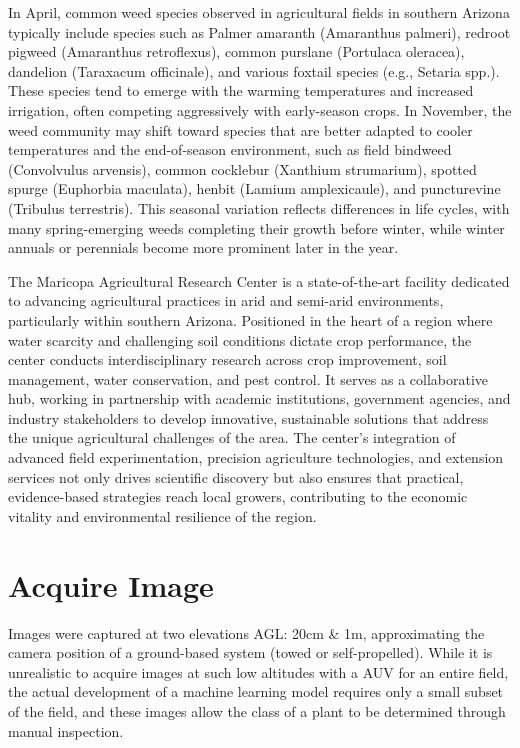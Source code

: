 \documentclass[letterpaper]{report}
\begin{document}
In April, common weed species observed in agricultural fields in southern Arizona typically include species such as Palmer amaranth (Amaranthus palmeri), redroot pigweed (Amaranthus retroflexus), common purslane (Portulaca oleracea), dandelion (Taraxacum officinale), and various foxtail species (e.g., Setaria spp.). These species tend to emerge with the warming temperatures and increased irrigation, often competing aggressively with early-season crops. In November, the weed community may shift toward species that are better adapted to cooler temperatures and the end-of-season environment, such as field bindweed (Convolvulus arvensis), common cocklebur (Xanthium strumarium), spotted spurge (Euphorbia maculata), henbit (Lamium amplexicaule), and puncturevine (Tribulus terrestris). This seasonal variation reflects differences in life cycles, with many spring-emerging weeds completing their growth before winter, while winter annuals or perennials become more prominent later in the year.

The Maricopa Agricultural Research Center is a state-of-the-art facility dedicated to advancing agricultural practices in arid and semi-arid environments, particularly within southern Arizona. Positioned in the heart of a region where water scarcity and challenging soil conditions dictate crop performance, the center conducts interdisciplinary research across crop improvement, soil management, water conservation, and pest control. It serves as a collaborative hub, working in partnership with academic institutions, government agencies, and industry stakeholders to develop innovative, sustainable solutions that address the unique agricultural challenges of the area. The center’s integration of advanced field experimentation, precision agriculture technologies, and extension services not only drives scientific discovery but also ensures that practical, evidence-based strategies reach local growers, contributing to the economic vitality and environmental resilience of the region.

\section{Acquire Image}
Images were captured at two elevations \gls{AGL}: 20cm \& 1m, approximating the camera position of a ground-based system (towed or self-propelled). While it is unrealistic to acquire images at such low altitudes with a AUV for an entire field, the actual development of a machine learning model requires only a small subset of the field, and these images allow the class of a plant to be determined through manual inspection. 
\end{document}
